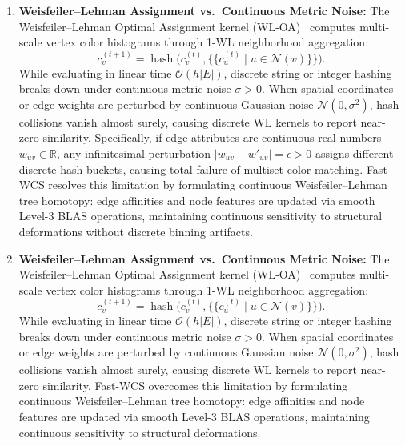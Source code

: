 \documentclass[a4paper,fleqn]{cas-dc}
\theoremstyle{thmstyleone}
\theoremstyle{thmstyletwo}
\theoremstyle{thmstylethree}
\begin{document}
\begin{enumerate}
    \item \textbf{Weisfeiler--Lehman Assignment vs.\ Continuous Metric Noise:} The Weisfeiler--Lehman Optimal Assignment kernel (WL-OA)~\cite{kriege2016valid, shervashidze2011weisfeiler} computes multi-scale vertex color histograms through 1-WL neighborhood aggregation:
    \begin{equation}
    c_v^{(t+1)} = \operatorname{hash}\Big( c_v^{(t)}, \{\!\!\{ c_u^{(t)} \mid u \in \mathcal{N}(v) \}\!\} \Big).
    \label{eq:wl_hash}
    \end{equation}
    While evaluating in linear time $\mathcal{O}(h|E|)$, discrete string or integer hashing breaks down under continuous metric noise $\sigma > 0$. When spatial coordinates or edge weights are perturbed by continuous Gaussian noise $\mathcal{N}(0, \sigma^2)$, hash collisions vanish almost surely, causing discrete WL kernels to report near-zero similarity. Specifically, if edge attributes are continuous real numbers $w_{uv} \in \mathbb{R}$, any infinitesimal perturbation $|w_{uv} - w'_{uv}| = \epsilon > 0$ assigns different discrete hash buckets, causing total failure of multiset color matching. Fast-WCS resolves this limitation by formulating continuous Weisfeiler--Lehman tree homotopy: edge affinities and node features are updated via smooth Level-3 BLAS operations, maintaining continuous sensitivity to structural deformations without discrete binning artifacts.
    \item \textbf{Weisfeiler--Lehman Assignment vs.\ Continuous Metric Noise:} The Weisfeiler--Lehman Optimal Assignment kernel (WL-OA)~\cite{kriege2016valid, shervashidze2011weisfeiler} computes multi-scale vertex color histograms through 1-WL neighborhood aggregation:
    \begin{equation}
    c_v^{(t+1)} = \operatorname{hash}\Big( c_v^{(t)}, \{\!\!\{ c_u^{(t)} \mid u \in \mathcal{N}(v) \}\!\} \Big).
    \label{eq:wl_hash}
    \end{equation}
    While evaluating in linear time $\mathcal{O}(h|E|)$, discrete string or integer hashing breaks down under continuous metric noise $\sigma > 0$. When spatial coordinates or edge weights are perturbed by continuous Gaussian noise $\mathcal{N}(0, \sigma^2)$, hash collisions vanish almost surely, causing discrete WL kernels to report near-zero similarity. Fast-WCS overcomes this limitation by formulating continuous Weisfeiler--Lehman tree homotopy: edge affinities and node features are updated via smooth Level-3 BLAS operations, maintaining continuous sensitivity to structural deformations.

\end{enumerate}
\end{document}
